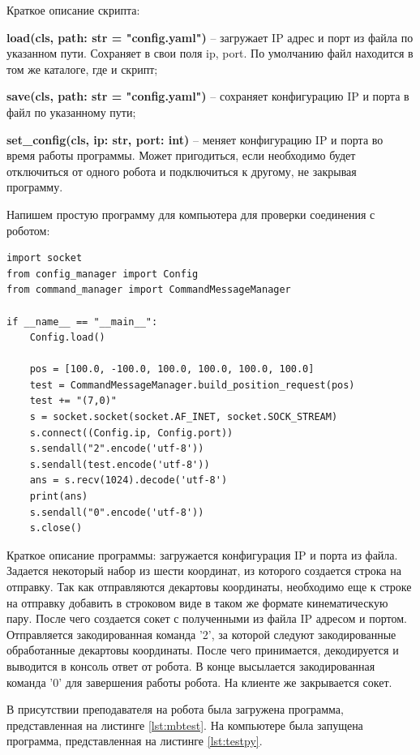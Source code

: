 \documentclass[a4paper,14pt]{extarticle}
\begin{document}
Краткое описание скрипта:
\begin{compactitem}
    \item \textbf{load(cls, path: str = "config.yaml")} -- загружает
    IP адрес и порт из файла по указанном пути. Сохраняет в свои поля ip, port.
    По умолчанию файл находится в том же каталоге, где и скрипт;
    \item \textbf{save(cls, path: str = "config.yaml")} -- сохраняет
    конфигурацию IP и порта в файл по указанному пути;
    \item \textbf{set\_config(cls, ip: str, port: int)} -- меняет
    конфигурацию IP и порта во время работы программы. Может пригодиться,
    если необходимо будет отключиться от одного робота и подключиться к другому,
    не закрывая программу.
\end{compactitem}


Напишем простую программу для компьютера для проверки соединения
с роботом:
\begin{lstlisting}[label=lst:testpy, caption={Простая программа на клиенте для проверки соединения с роботом.}]
import socket
from config_manager import Config
from command_manager import CommandMessageManager

if __name__ == "__main__":
    Config.load()

    pos = [100.0, -100.0, 100.0, 100.0, 100.0, 100.0]
    test = CommandMessageManager.build_position_request(pos)
    test += "(7,0)"
    s = socket.socket(socket.AF_INET, socket.SOCK_STREAM)
    s.connect((Config.ip, Config.port))
    s.sendall("2".encode('utf-8'))
    s.sendall(test.encode('utf-8'))
    ans = s.recv(1024).decode('utf-8')
    print(ans)
    s.sendall("0".encode('utf-8'))
    s.close()
\end{lstlisting}


Краткое описание программы: загружается конфигурация IP и порта
из файла. Задается некоторый набор из шести координат, из которого создается строка
на отправку. Так как отправляются декартовы координаты, необходимо
еще к строке на отправку добавить в строковом виде в таком же
формате кинематическую пару. После чего создается сокет
с полученными из файла IP адресом и портом. Отправляется закодированная команда '2',
за которой следуют закодированные обработанные декартовы координаты.
После чего принимается, декодируется и выводится в консоль ответ от робота.
В конце высылается закодированная команда '0' для завершения работы робота.
На клиенте же закрывается сокет.


В присутствии преподавателя на робота была загружена программа,
представленная на листинге \ref{lst:mbtest}. На компьютере
была запущена программа, представленная на листинге \ref{lst:testpy}.
\end{document}

